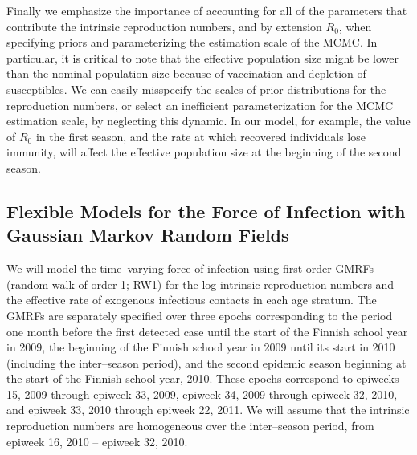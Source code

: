 Finally we emphasize the importance of accounting for all of the parameters that contribute the intrinsic reproduction numbers, and by extension $ R_0 $, when specifying priors and parameterizing the estimation scale of the MCMC. In particular, it is critical to note that the effective population size might be lower than the nominal population size because of vaccination and depletion of susceptibles. We can easily misspecify the scales of prior distributions for the reproduction numbers, or select an inefficient parameterization for the MCMC estimation scale, by neglecting this dynamic. In our model, for example, the value of $ R_0 $ in the first season, and the rate at which recovered individuals lose immunity, will affect the effective population size at the beginning of the second season. 

\subsection{Flexible Models for the Force of Infection with Gaussian Markov Random Fields}
\label{subsec:flu_gmrf}

We will model the time--varying force of infection using first order GMRFs (random walk of order 1; RW1) for the log intrinsic reproduction numbers and the effective rate of exogenous infectious contacts in each age stratum. The GMRFs are separately specified over three epochs corresponding to the period one month before the first detected case until the start of the Finnish school year in 2009, the beginning of the Finnish school year in 2009 until its start in 2010 (including the inter--season period), and the second epidemic season beginning at the start of the Finnish school year, 2010. These epochs correspond to epiweeks 15, 2009 through epiweek 33, 2009, epiweek 34, 2009 through epiweek 32, 2010, and epiweek 33, 2010 through epiweek 22, 2011. We will assume that the intrinsic reproduction numbers are homogeneous over the inter--season period, from epiweek 16, 2010 -- epiweek 32, 2010.

